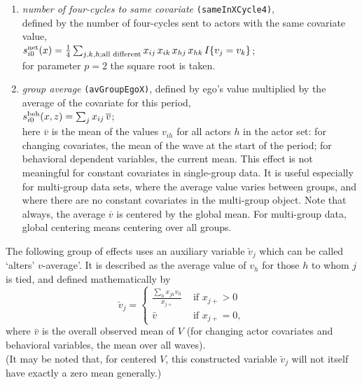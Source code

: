 \documentclass[a4paper,fleqn,11pt]{article}
\newcommand{\+}{\, + \,}
\newcommand{\vit}{\theenumi}
\newcounter{savenumi}
\begin{document}
\begin{enumerate}
 \item
 {\em number of four-cycles to same covariate}  \texttt{(sameInXCycle4)},\\
 defined by the number of four-cycles sent to actors with the
 same covariate value,  \\[0.3em]
 $s^{\rm net}_{i\vit}(x) =  \frac14 \sum_{j,k,h; \text{all different}}
            x_{ij}\, x_{ik}\, x_{hj}\, x_{hk}\,I\{v_j = v_k\} $;\\[0.3em]
 for parameter $p=2$ the square root is taken.

 \item {\em group average} \texttt{(avGroupEgoX)}, defined by ego's value multiplied by the
 average of the covariate for this period,  \\
 $s^{\rm beh}_{i\vit}(x, z) =  \sum_j x_{ij} \, \overline {v}  $;\\
 here $\overline {v}$ is the mean of the values $v_{ih}$ for all actors $h$
 in the actor set: for changing covariates, the mean of the wave at the
 start of the period; for behavioral dependent variables,
 the current mean.
 This effect is not meaningful for constant covariates in single-group data.
 It is useful especially for multi-group data sets, where the average value
 varies between groups, and where there are no constant covariates
 in the multi-group object.
 Note that always, the average $\overline {v} $ is centered by the global mean.
 For multi-group data, global centering means centering over all groups.

\setcounter{savenumi}{\value{enumi}}

\end{enumerate}

\noindent
The following group of effects uses an auxiliary variable $\breve v_j$ which
can be called `alters' $v$-average'.
It is described as the average value of $v_h$ for those $h$
to whom $j$ is tied, and defined mathematically by
\begin{equation}
  \breve v_j = \left\{\begin{array}{ll} \displaystyle
         \frac{\sum_h x_{jh}v_h}{x_{j+}}  &  \text{ if } x_{j+} > 0     \\
         \bar v                                &  \text{ if } x_{j+} = 0  ,
  \end{array}   \right.            \label{alt_av}
\end{equation}
where $\bar v$ is the overall observed mean of $V$ (for changing
actor covariates and behavioral variables, the mean over all waves).\\
(It may be noted that, for centered $V$, this constructed variable $\breve v_j$
will not itself have exactly a zero mean generally.)
\end{document}
